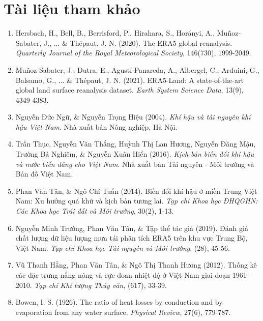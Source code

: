 \documentclass[12pt,a4paper]{article}
\begin{document}
\section{Tài liệu tham khảo}
\begin{enumerate}
    \item Hersbach, H., Bell, B., Berrisford, P., Hirahara, S., Horányi, A., Muñoz‐Sabater, J., ... \& Thépaut, J. N. (2020). The ERA5 global reanalysis. \textit{Quarterly Journal of the Royal Meteorological Society}, 146(730), 1999-2049.
    
    \item Muñoz-Sabater, J., Dutra, E., Agustí-Panareda, A., Albergel, C., Arduini, G., Balsamo, G., ... \& Thépaut, J. N. (2021). ERA5-Land: A state-of-the-art global land surface reanalysis dataset. \textit{Earth System Science Data}, 13(9), 4349-4383.
    
    \item Nguyễn Đức Ngữ, \& Nguyễn Trọng Hiệu (2004). \textit{Khí hậu và tài nguyên khí hậu Việt Nam}. Nhà xuất bản Nông nghiệp, Hà Nội.
    
    \item Trần Thục, Nguyễn Văn Thắng, Huỳnh Thị Lan Hương, Nguyễn Đăng Mậu, Trường Bá Nghiêm, \& Nguyễn Xuân Hiển (2016). \textit{Kịch bản biến đổi khí hậu và nước biển dâng cho Việt Nam}. Nhà xuất bản Tài nguyên - Môi trường và Bản đồ Việt Nam.
    
    \item Phan Văn Tân, \& Ngô Chí Tuấn (2014). Biến đổi khí hậu ở miền Trung Việt Nam: Xu hướng quá khứ và kịch bản tương lai. \textit{Tạp chí Khoa học ĐHQGHN: Các Khoa học Trái đất và Môi trường}, 30(2), 1-13.
    
    \item Nguyễn Minh Trường, Phan Văn Tân, \& Tập thể tác giả (2019). Đánh giá chất lượng dữ liệu lượng mưa tái phân tích ERA5 trên khu vực Trung Bộ, Việt Nam. \textit{Tạp chí Khoa học Tài nguyên và Môi trường}, (28), 45-56.
    
    \item Vũ Thanh Hằng, Phan Văn Tân, \& Ngô Thị Thanh Hương (2012). Thống kê các đặc trưng nắng nóng và cực đoan nhiệt độ ở Việt Nam giai đoạn 1961-2010. \textit{Tạp chí Khí tượng Thủy văn}, (617), 33-39.
    
    \item Bowen, I. S. (1926). The ratio of heat losses by conduction and by evaporation from any water surface. \textit{Physical Review}, 27(6), 779-787.
    

\end{enumerate}
\end{document}
